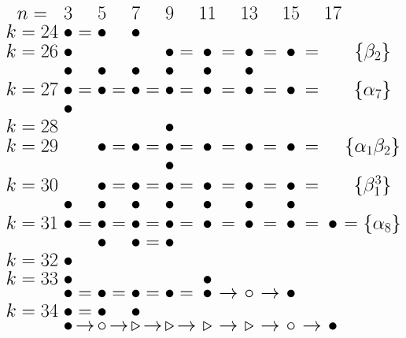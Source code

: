 \documentclass{article}
\begin{document}
\(
\begin{tikzcd}[nodes={font=\huge,inner sep=0pt},row sep=0.2cm,column sep=0.1cm]
n= & & 3 & & 5 & & 7 & & 9 & & 11 & & 13 & & 15 & & 17 &  \\
k=24 && \bullet &=& \bullet && \bullet \\
k=26 && \bullet && && && \bullet &=& \bullet &=& \bullet &=& \bullet & = && \{\beta_2\} \\
 && \bullet && \bullet && \bullet && \bullet && \bullet && \bullet \\
k=27 && \bullet &=& \bullet &=& \bullet &=& \bullet &=& \bullet &=& \bullet &=& \bullet & = && \{\alpha_7\} \\
 && \bullet \\
k=28 && && && && \bullet \\
k=29 && && \bullet &=& \bullet &=& \bullet &=& \bullet &=& \bullet &=& \bullet & = && \{\alpha_1\beta_2\} \\
 && && && && \bullet \\
k=30 && && \bullet &=& \bullet &=& \bullet &=& \bullet &=& \bullet &=& \bullet & = && \{\beta_1^3\} \\
 && \bullet && \bullet && \bullet && \bullet && \bullet && \bullet && \bullet \\
k=31 && \bullet &=& \bullet &=& \bullet &=& \bullet &=& \bullet &=& \bullet &=& \bullet & = & \bullet & = \{\alpha_8\} \\
 && && \bullet && \bullet &=& \bullet && && && \\
k=32 && \bullet && && && \\
k=33 && \bullet && && && && \bullet \\
 && \bullet &=& \bullet &=& \bullet &=& \bullet &=& \bullet & \rightarrow & \circ & \rightarrow & \bullet \\
k=34 && \bullet &=& \bullet && \bullet \\
 && \bullet & \rightarrow & \circ & \rightarrow & \triangleright & \rightarrow & \triangleright & \rightarrow & \triangleright & \rightarrow & \triangleright & \rightarrow & \circ & \rightarrow & \bullet \\
\end{tikzcd}
\)
\end{document}
